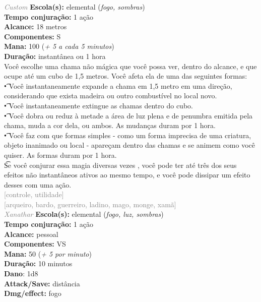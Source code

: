 \documentclass{RPG_Adventure}[2021/10/20]
\begin{document}
{\tiny \textcolor{gray}{\textit{Custom}}}\jump{}
{\small \t \textbf{Escola(s):} elemental (\textit{fogo, sombras})\\\t \textbf{Tempo conjuração:} 1 ação\\\t \textbf{Alcance:} 18 metros\\\t \textbf{Componentes:} S\\\t \textbf{Mana:} 100 (\textit{+ 5 a cada 5 minutos})\\\t \textbf{Duração:} instantânea ou 1 hora\\}
{\normalsize Você escolhe uma chama não mágica que você possa ver, dentro do alcance, e que ocupe até um cubo de 1,5 metros. Você afeta ela de uma das seguintes formas:\\\t • Você instantaneamente expande a chama em 1,5 metro em uma direção, considerando que exista madeira ou outro combustível no local novo.\\\t • Você instantaneamente extingue as chamas dentro do cubo.\\\t • Você dobra ou reduz à metade a área de luz plena e de penumbra emitida pela chama, muda a cor dela, ou ambos. As mudanças duram por 1 hora.\\\t • Você faz com que formas simples - como um forma imprecisa de uma criatura, objeto inanimado ou local - apareçam dentro das chamas e se animem como você quiser. As formas duram por 1 hora.\\\t Se você conjurar essa magia diversas vezes , você pode ter até três dos seus efeitos não instantâneos ativos ao mesmo tempo, e você pode dissipar um efeito desses com uma ação.\\}
{\scriptsize \textcolor{gray}{[controle, utilidade]\\}}
{\scriptsize \textcolor{gray}{[arqueiro, bardo, guerreiro, ladino, mago, monge, xamã]\\}}
{\tiny \textcolor{gray}{\textit{Xanathar}}}\jump{}
{\small \t \textbf{Escola(s):} elemental (\textit{fogo, luz, sombras})\\\t \textbf{Tempo conjuração:} 1 ação\\\t \textbf{Alcance:} pessoal\\\t \textbf{Componentes:} VS\\\t \textbf{Mana:} 50 (\textit{+ 5 por minuto})\\\t \textbf{Duração:} 10 minutos\\\t \textbf{Dano}: 1d8\\\t \textbf{Attack/Save:} distância\\\t \textbf{Dmg/effect:} fogo\\}
\end{document}
